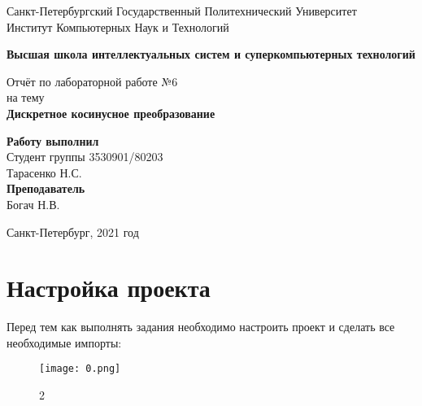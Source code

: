 \documentclass[10pt,a4paper,oneside]{article}
\begin{document}
\begin{titlepage}
\newpage
	\begin{center}
		\Large Санкт-Петербургский Государственный Политехнический Университет\\
		Институт Компьютерных Наук и Технологий\\
	\end{center}
	\begin{center}
		\large\textbf {Высшая школа интеллектуальных систем и суперкомпьютерных технологий}
	\end{center}
	
	\vspace{5em}
	\begin{center}
		\large{Отчёт по лабораторной работе №6 \\ на тему \\
		\textbf{Дискретное косинусное преобразование} }
	\end{center}
	
	\vspace{25em}
	\begin{flushright}
		\textbf{Работу выполнил\\}Студент группы 3530901/80203 \\ Тарасенко Н.С.\\
		\textbf{Преподаватель\\}Богач Н.В. 
	\end{flushright}
	
	\vspace{\fill}%
	\begin{center}
	Санкт-Петербург, 2021 год	
	\end{center}
\end{titlepage} %

\section{Настройка проекта}
Перед тем как выполнять задания необходимо настроить проект и сделать все необходимые импорты:

\begin{figure}[H]
        \centering
        \texttt{[image: 0.png]}
        \caption{2}
        \label{fig:first}
\end{figure}
\end{document}

